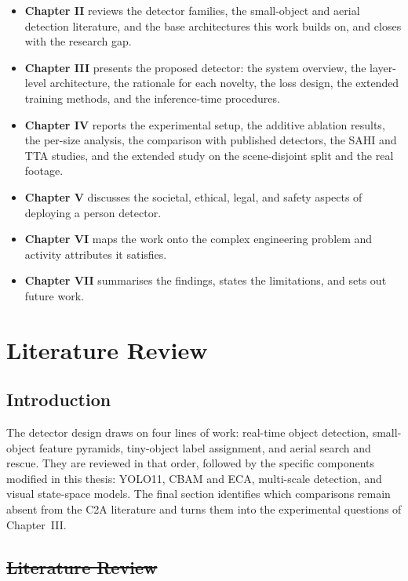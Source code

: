 \documentclass[12pt,a4paper,oneside]{report}
\providecommand{\DIFadd}[1]{{\protect\color{blue}\uwave{#1}}} %
\providecommand{\DIFdel}[1]{{\protect\color{red}\sout{#1}}}                      %
\providecommand{\DIFaddbegin}{} %
\providecommand{\DIFaddend}{} %
\providecommand{\DIFdelbegin}{} %
\providecommand{\DIFdelend}{} %
\begin{document}
\begin{itemize}
  \item \textbf{Chapter II} reviews the detector families, the small-object
        and aerial detection literature, and the base architectures this work
        builds on, and closes with the research gap.
  \item \textbf{Chapter III} presents the proposed detector: the system
        overview, the layer-level architecture, the rationale for each
        novelty, the loss design, the extended training methods, and the
        inference-time procedures.
  \item \textbf{Chapter IV} reports the experimental setup, the additive
        ablation results, the per-size analysis, the comparison with
        published detectors, the SAHI and TTA studies, and the extended
        study on the scene-disjoint split and the real footage.
  \item \textbf{Chapter V} discusses the societal, ethical, legal, and safety
        aspects of deploying a person detector.
  \item \textbf{Chapter VI} maps the work onto the complex engineering
        problem and activity attributes it satisfies.
  \item \textbf{Chapter VII} summarises the findings, states the limitations,
        and sets out future work.
\end{itemize}
 \newpage 
 \newpage \chapter{Literature Review}

\section{Introduction}
The detector design draws on four lines of work: real-time object detection,
small-object feature pyramids, tiny-object label assignment, and aerial search
and rescue. They are reviewed in that order, followed by the specific components
modified in this thesis: YOLO11, CBAM and ECA, multi-scale detection, and visual
state-space models. The final section identifies which comparisons remain absent
from the C2A literature and turns them into the experimental questions of
Chapter~III.

\section{\DIFdelbegin \DIFdel{Literature Review}\DIFdelend \DIFaddbegin \DIFadd{Related Works}\DIFaddend }
\end{document}
